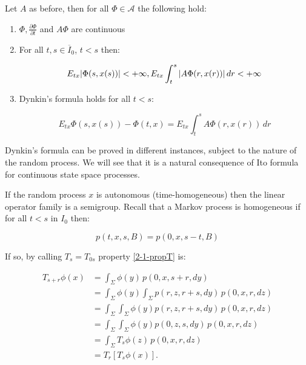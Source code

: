\begin{proposition}
    Let $A$ as before, then for all $\Phi\in\mathcal{A}$ the following hold:

    \begin{enumerate}
        \item $\Phi,\frac{\partial\Phi}{\partial t}$ and $A\Phi$ are continuous
        \item For all $t,s\in\overline{I}_0$, $t<s$ then:
        
        \[E_{tx}\abs{\Phi(s,x(s))}< +\infty,E_{tx}\int_t^s\abs{A\Phi(r,x(r))}\,dr < +\infty\]
        
        \item Dynkin's formula holds for all $t<s$:
        
        \begin{equation}\label{2-1-dynkform}
            E_{tx}\Phi(s,x(s)) - \Phi(t,x) = E_{tx}\int_t^s A\Phi(r,x(r)) \,dr
        \end{equation}
    \end{enumerate}


\end{proposition}

Dynkin's formula can be proved in different instances, subject to the nature of the random process. We will see 
that it is a natural consequence of Ito formula for continuous state space processes.

If the random process $x$ is autonomous (time-homogeneous) then the linear operator family is a 
semigroup. Recall that a Markov process is homogeneous if for all $t<s$ in $I_0$ then:

\[p(t,x,s,B) = p(0,x,s-t,B)\]

If so, by calling $T_s=T_{0s}$ property \ref{2-1-propT} is:

\begin{align}
    T_{s+r}\phi(x) & = \int_{\Sigma} \phi(y)\,p(0,x,s+r,dy) \\
    & = \int_{\Sigma}\phi(y)\int_{\Sigma} p(r,z,r+s,dy)\,p(0,x,r,dz) \\
    & = \int_{\Sigma}\int_{\Sigma} \phi(y) p(r,z,r+s,dy)\,p(0,x,r,dz) \\
    & = \int_{\Sigma}\int_{\Sigma} \phi(y) p(0,z,s,dy)\,p(0,x,r,dz) \\
    & = \int_{\Sigma} T_{s}\phi(z) \,p(0,x,r,dz) \\
    & = T_r\left[T_s\phi(x)\right].
\end{align}

